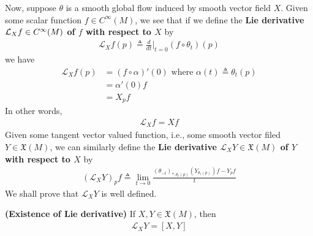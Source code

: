 \documentclass{report}
\begin{document}
\begin{mdframed}
Now, suppose $\theta$ is a smooth global flow induced by smooth vector field $X$. Given some scalar function $f \in C^{\infty}(M)$, we see that if we define the \textbf{Lie derivative $\mathcal{L}_Xf\in C^{\infty}(M)$ of $f$ with respect to  $X$} by 
\begin{align*}
\mathcal{L}_Xf(p)\triangleq \frac{d}{dt}\Big|_{t=0}(f\circ \theta_t)(p)
\end{align*}
we have 
\begin{align*}
\mathcal{L}_Xf(p)&=(f\circ \alpha )'(0)\text{ where }\alpha (t)\triangleq \theta_t(p)\\
&=\alpha '(0)f \\
&=X_pf
\end{align*}
In other words, 
\begin{align*}
\mathcal{L}_Xf=Xf
\end{align*}
Given some tangent vector valued function, i.e., some smooth vector filed $Y \in \mathfrak{X}(M)$, we can similarly define the \textbf{Lie derivative $\mathcal{L}_XY\in \mathfrak{X}(M)$ of $Y$ with respect to  $X$} by 
\begin{align*}
  (\mathcal{L}_XY)_pf\triangleq \lim_{t\to 0} \frac{(\theta_{-t})_{*,\theta_t(p)}(Y_{\theta_t(p)})f-Y_pf}{t} 
\end{align*}
We shall prove that $\mathcal{L}_XY$ is well defined. 



\end{mdframed}
\begin{theorem}
\textbf{(Existence of Lie derivative)} If $X,Y\in \mathfrak{X}(M)$, then 
 \begin{align*}
\mathcal{L}_XY=[X,Y]
\end{align*}
\end{theorem}
\end{document}

